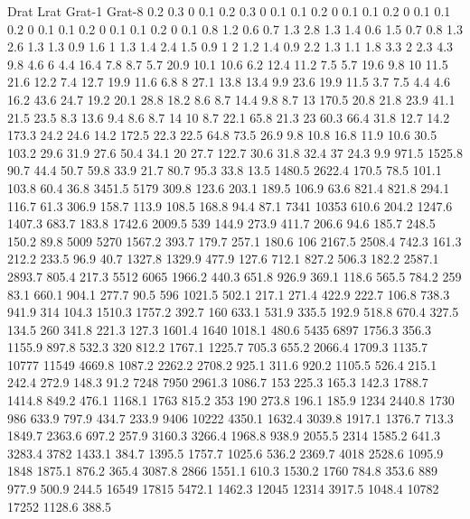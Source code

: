 Drat	Lrat	Grat-1	Grat-8
0.2	0.3	0	0.1
0.2	0.3	0	0.1
0.1	0.2	0	0.1
0.1	0.2	0	0.1
0.1	0.2	0	0.1
0.1	0.2	0	0.1
0.1	0.2	0	0.1
0.8	1.2	0.6	0.7
1.3	2.8	1.3	1.4
0.6	1.5	0.7	0.8
1.3	2.6	1.3	1.3
0.9	1.6	1	1.3
1.4	2.4	1.5	0.9
1	2	1.2	1.4
0.9	2.2	1.3	1.1
1.8	3.3	2	2.3
4.3	9.8	4.6	6
4.4	16.4	7.8	8.7
5.7	20.9	10.1	10.6
6.2	12.4	11.2	7.5
5.7	19.6	9.8	10
11.5	21.6	12.2	7.4
12.7	19.9	11.6	6.8
8	27.1	13.8	13.4
9.9	23.6	19.9	11.5
3.7	7.5	4.4	4.6
16.2	43.6	24.7	19.2
20.1	28.8	18.2	8.6
8.7	14.4	9.8	8.7
13	170.5	20.8	21.8
23.9	41.1	21.5	23.5
8.3	13.6	9.4	8.6
8.7	14	10	8.7
22.1	65.8	21.3	23
60.3	66.4	31.8	12.7
14.2	173.3	24.2	24.6
14.2	172.5	22.3	22.5
64.8	73.5	26.9	9.8
10.8	16.8	11.9	10.6
30.5	103.2	29.6	31.9
27.6	50.4	34.1	20
27.7	122.7	30.6	31.8
32.4	37	24.3	9.9
971.5	1525.8	90.7	44.4
50.7	59.8	33.9	21.7
80.7	95.3	33.8	13.5
1480.5	2622.4	170.5	78.5
101.1	103.8	60.4	36.8
3451.5	5179	309.8	123.6
203.1	189.5	106.9	63.6
821.4	821.8	294.1	116.7
61.3	306.9	158.7	113.9
108.5	168.8	94.4	87.1
7341	10353	610.6	204.2
1247.6	1407.3	683.7	183.8
1742.6	2009.5	539	144.9
273.9	411.7	206.6	94.6
185.7	248.5	150.2	89.8
5009	5270	1567.2	393.7
179.7	257.1	180.6	106
2167.5	2508.4	742.3	161.3
212.2	233.5	96.9	40.7
1327.8	1329.9	477.9	127.6
712.1	827.2	506.3	182.2
2587.1	2893.7	805.4	217.3
5512	6065	1966.2	440.3
651.8	926.9	369.1	118.6
565.5	784.2	259	83.1
660.1	904.1	277.7	90.5
596	1021.5	502.1	217.1
271.4	422.9	222.7	106.8
738.3	941.9	314	104.3
1510.3	1757.2	392.7	160
633.1	531.9	335.5	192.9
518.8	670.4	327.5	134.5
260	341.8	221.3	127.3
1601.4	1640	1018.1	480.6
5435	6897	1756.3	356.3
1155.9	897.8	532.3	320
812.2	1767.1	1225.7	705.3
655.2	2066.4	1709.3	1135.7
10777	11549	4669.8	1087.2
2262.2	2708.2	925.1	311.6
920.2	1105.5	526.4	215.1
242.4	272.9	148.3	91.2
7248	7950	2961.3	1086.7
153	225.3	165.3	142.3
1788.7	1414.8	849.2	476.1
1168.1	1763	815.2	353
190	273.8	196.1	185.9
1234	2440.8	1730	986
633.9	797.9	434.7	233.9
9406	10222	4350.1	1632.4
3039.8	1917.1	1376.7	713.3
1849.7	2363.6	697.2	257.9
3160.3	3266.4	1968.8	938.9
2055.5	2314	1585.2	641.3
3283.4	3782	1433.1	384.7
1395.5	1757.7	1025.6	536.2
2369.7	4018	2528.6	1095.9
1848	1875.1	876.2	365.4
3087.8	2866	1551.1	610.3
1530.2	1760	784.8	353.6
889	977.9	500.9	244.5
16549	17815	5472.1	1462.3
12045	12314	3917.5	1048.4
10782	17252	1128.6	388.5

